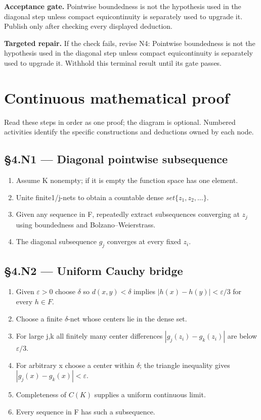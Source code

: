 \documentclass[preprint,12pt,aps,pra,showkeys,amsmath,amssymb,superscriptaddress,floatfix]{revtex4-2}
\theoremstyle{definition}
\theoremstyle{remark}
\newcommand{\field}[2]{\par\smallskip\noindent\textbf{#1.} #2\par}
\begin{document}
\field{Acceptance gate}{Pointwise boundedness is not the hypothesis used in the diagonal step
unless compact equicontinuity is separately used to upgrade it. Publish
only after checking every displayed deduction.}

\field{Targeted repair}{If the check fails, revise N4: Pointwise boundedness is not the
hypothesis used in the diagonal step unless compact equicontinuity is
separately used to upgrade it. Withhold this terminal result until its
gate passes.}

\endgroup\clearpage\section{Continuous mathematical proof}\label{sec:proof}

Read these steps in order as one proof; the diagram is optional.
Numbered activities identify the specific constructions and deductions
owned by each node.

\subsection{§4.N1 --- Diagonal pointwise
subsequence}\label{n1-diagonal-pointwise-subsequence}

\begin{enumerate}
\def\labelenumi{\arabic{enumi}.}
\item
  Assume K nonempty; if it is empty the function space has one element.
\item
  Unite finite1/j-nets to obtain a countable dense
  \(set\{z_{1},z_{2},\ldots \}\).
\item
  Given any sequence in F, repeatedly extract subsequences converging at
  \(z_j\) using boundedness and Bolzano--Weierstrass.
\item
  The diagonal subsequence \(g_j\) converges at every fixed \(z_i\).
\end{enumerate}

\subsection{§4.N2 --- Uniform Cauchy
bridge}\label{n2-uniform-cauchy-bridge}

\begin{enumerate}
\def\labelenumi{\arabic{enumi}.}
\item
  Given \(\varepsilon >0\) choose \(\delta\) so \(d(x,y)<\delta\)
  implies \(|h(x)-h(y)|<\varepsilon /3\) for every \(h\in F\).
\item
  Choose a finite \(\delta\)-net whose centers lie in the dense set.
\item
  For large j,k all finitely many center differences
  \(|g_j(z_i)-g_k(z_i)|\) are below \(\varepsilon /3\).
\item
  For arbitrary x choose a center within \(\delta\); the triangle
  inequality gives \(|g_j(x)-g_k(x)|<\varepsilon\).
\item
  Completeness of \(C(K)\) supplies a uniform continuous limit.
\item
  Every sequence in F has such a subsequence.
\end{enumerate}
\end{document}
